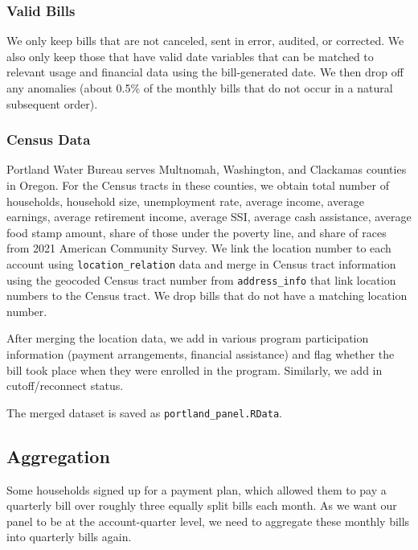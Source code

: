 \documentclass[11pt]{article}
\begin{document}
\subsubsection*{Valid Bills}

We only keep bills that are not canceled, sent in error, audited, or corrected. We also only keep those that have valid date variables that can be matched to relevant usage and financial data using the bill-generated date. We then drop off any anomalies (about 0.5\% of the monthly bills that do not occur in a natural subsequent order).

\subsubsection*{Census Data}

Portland Water Bureau serves Multnomah, Washington, and Clackamas counties in Oregon. For the Census tracts in these counties, we obtain total number of households, household size, unemployment rate, average income, average earnings, average retirement income, average SSI, average cash assistance, average food stamp amount, share of those under the poverty line, and share of races from 2021 American Community Survey. We link the location number to each account using \texttt{location\_relation} data and merge in Census tract information using the geocoded Census tract number from \texttt{address\_info} that link location numbers to the Census tract. We drop bills that do not have a matching location number.

After merging the location data, we add in various program participation information (payment arrangements, financial assistance) and flag whether the bill took place when they were enrolled in the program. Similarly, we add in cutoff/reconnect status.

The merged dataset is saved as \texttt{portland\_panel.RData}.

\subsection*{Aggregation}

Some households signed up for a payment plan, which allowed them to pay a quarterly bill over roughly three equally split bills each month. As we want our panel to be at the account-quarter level, we need to aggregate these monthly bills into quarterly bills again.
\end{document}
